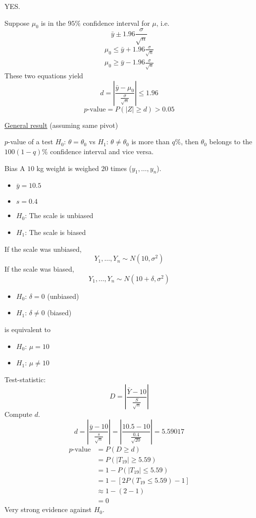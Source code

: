 YES\@.

Suppose $ \mu_0 $ is in the $ 95\% $ confidence interval for $ \mu $, i.e.
\[ \bar{y}\pm 1.96 \frac{\sigma}{\sqrt{n}} \]
\[ \begin{aligned}
        \mu_0\leqslant \bar{y}+1.96 \frac{\sigma}{\sqrt{n}} \\
        \mu_0\geqslant \bar{y}-1.96 \frac{\sigma}{\sqrt{n}}
    \end{aligned}
\]
These two equations yield
\[ d=\left|\frac{\bar{y}-\mu_0}{\frac{\sigma}{\sqrt{n}}} \right|\leqslant 1.96 \]
\[ p\text{-value}=P(|Z|\geqslant d)>0.05 \]

\underline{General result} (assuming same pivot)

$ p $-value of a test $ H_0 $: $ \theta=\theta_0 $ vs $ H_1 $: $ \theta\neq \theta_0 $
is more than $ q\% $, then $ \theta_0 $ belongs to the $ 100(1-q)\% $
confidence interval and vice versa.


\begin{Example}{Bias}{}
    A $ 10 $ kg weight is weighed $ 20 $ times ($ y_1,\ldots ,y_n $).
    \begin{itemize}
        \item $ \bar{y}=10.5 $
        \item $ s=0.4 $
        \item $ H_0 $: The scale is unbiased
        \item $ H_1 $: The scale is biased
    \end{itemize}
    If the scale was unbiased,
    \[ Y_1,\ldots ,Y_n \sim N(10,\sigma^2) \]
    If the scale was biased,
    \[ Y_1,\ldots ,Y_n \sim N(10+\delta,\sigma^2) \]
    \begin{itemize}
        \item $ H_0 $: $ \delta=0 $ (unbiased)
        \item $ H_1 $: $ \delta\neq 0 $ (biased)
    \end{itemize}
    is equivalent to
    \begin{itemize}
        \item $ H_0 $: $ \mu=10 $
        \item $ H_1 $: $ \mu\neq 10 $
    \end{itemize}
    Test-statistic:
    \[ D=\left|\frac{\bar{Y}-10}{\frac{S}{\sqrt{n}}} \right| \]
    Compute $ d $.
    \[ d=
        \left|\frac{\bar{y}-10}{\frac{s}{\sqrt{n}}} \right|=
        \left|\frac{10.5-10}{\frac{0.4}{\sqrt{20}}} \right|=5.59017 \]
    \[
        \begin{aligned}
            p\text{-value}
             & =P(D\geqslant d)                             \\
             & =P(|T_{19}|\geqslant 5.59)                   \\
             & = 1-P(|T_{19}|\leqslant 5.59)                \\
             & =1-\left[ 2P(T_{19}\leqslant 5.59)-1 \right] \\
             & \approx 1-(2-1)                              \\
             & =0
        \end{aligned}
    \]
    Very strong evidence against $ H_0 $.
\end{Example}



